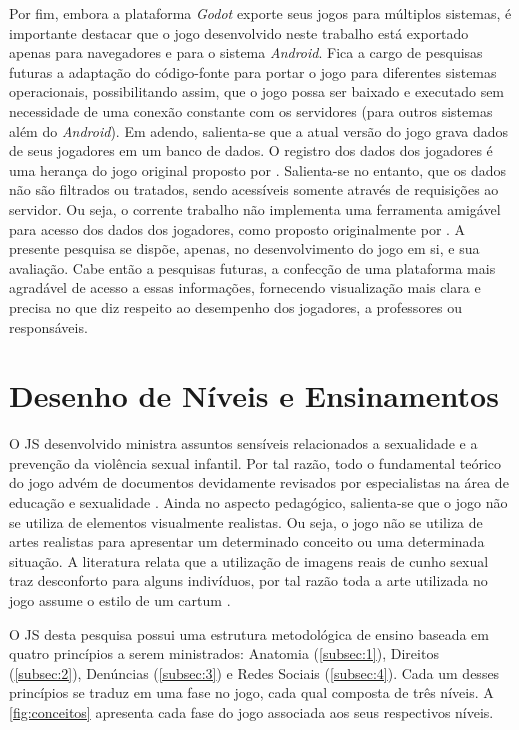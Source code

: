 Por fim, embora a plataforma \textit{Godot} exporte seus jogos para múltiplos sistemas, é importante destacar que o jogo desenvolvido neste trabalho está exportado apenas para navegadores e para o sistema \textit{Android}. Fica a cargo de pesquisas futuras a adaptação do código-fonte para portar o jogo para diferentes sistemas operacionais, possibilitando assim, que o jogo possa ser baixado e executado sem necessidade de uma conexão constante com os servidores (para outros sistemas além do \textit{Android}). Em adendo, salienta-se que a atual versão do jogo grava dados de seus jogadores em um banco de dados. O registro dos dados dos jogadores é uma herança do jogo original proposto por . Salienta-se no entanto, que os dados não são filtrados ou tratados, sendo acessíveis somente através de requisições ao servidor. Ou seja, o corrente trabalho não implementa uma ferramenta amigável para acesso dos dados dos jogadores, como proposto originalmente por . A presente pesquisa se dispõe, apenas, no desenvolvimento do jogo em si, e sua avaliação. Cabe então a pesquisas futuras, a confecção de uma plataforma mais agradável de acesso a essas informações, fornecendo visualização mais clara e precisa no que diz respeito ao desempenho dos jogadores, a professores ou responsáveis.  



\section{Desenho de Níveis e Ensinamentos}\label{sec:DN}

O \acf{JS} desenvolvido ministra assuntos sensíveis relacionados a sexualidade e a prevenção da violência sexual infantil. Por tal razão, todo o fundamental teórico do jogo advém de documentos devidamente revisados por especialistas na área de educação e sexualidade \cite{unesco2018international}. Ainda no aspecto pedagógico, salienta-se que o jogo não se utiliza de elementos visualmente realistas. Ou seja, o jogo não se utiliza de artes realistas para apresentar um determinado conceito ou uma determinada situação. A literatura relata que a utilização de imagens reais de cunho sexual traz desconforto para alguns indivíduos, por tal razão toda a arte utilizada no jogo assume o estilo de um cartum \cite{albert2020desenvolvimento}.

O \ac{JS} desta pesquisa possui uma estrutura metodológica de ensino baseada em quatro princípios a serem ministrados: Anatomia (\autoref{subsec:1}), Direitos (\autoref{subsec:2}), Denúncias (\autoref{subsec:3}) e Redes Sociais (\autoref{subsec:4}). Cada um desses princípios se traduz em uma fase no jogo, cada qual composta de três níveis. A \autoref{fig:conceitos} apresenta cada fase do jogo associada aos seus respectivos níveis.

